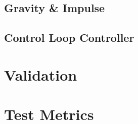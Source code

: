 \subsection{Gravity \& Impulse}

\subsection{Control Loop Controller}

\section{Validation}
\label{sec:validation}

\section{Test Metrics}
\label{sec:test_metrics}


